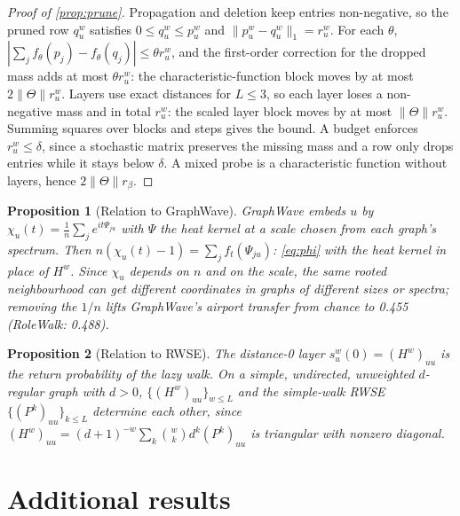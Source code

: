 \documentclass[10pt]{article}
\newtheorem{proposition}{Proposition}
\theoremstyle{definition}
\newcommand{\nTh}{\lVert\Theta\rVert}
\begin{document}
\begin{proof}[Proof of \cref{prop:prune}]
Propagation and deletion keep entries non-negative, so the pruned row $q^w_u$ satisfies $0\le q^w_u\le p^w_u$ and $\lVert p^w_u - q^w_u\rVert_1 = r^w_u$. For each $\theta$, $|\sum_j f_\theta(p_j)-f_\theta(q_j)|\le\theta r^w_u$, and the first-order correction for the dropped mass adds at most $\theta r^w_u$: the characteristic-function block moves by at most $2\nTh r^w_u$. Layers use exact distances for $L\le3$, so each layer loses a non-negative mass and in total $r^w_u$: the scaled layer block moves by at most $\nTh r^w_u$. Summing squares over blocks and steps gives the bound. A budget enforces $r^w_u\le\delta$, since a stochastic matrix preserves the missing mass and a row only drops entries while it stays below $\delta$. A mixed probe is a characteristic function without layers, hence $2\nTh r_\beta$.
\end{proof}

\begin{proposition}[Relation to GraphWave]\label{prop:graphwave}
GraphWave embeds $u$ by $\chi_u(t) = \frac1n\sum_j e^{it\Psi_{ju}}$ with $\Psi$ the heat kernel at a scale chosen from each graph's spectrum. Then $n(\chi_u(t)-1) = \sum_j f_t(\Psi_{ju})$: \eqref{eq:phi} with the heat kernel in place of $H^w$. Since $\chi_u$ depends on $n$ and on the scale, the same rooted neighbourhood can get different coordinates in graphs of different sizes or spectra; removing the $1/n$ lifts GraphWave's airport transfer from chance to 0.455 (RoleWalk: 0.488).
\end{proposition}

\begin{proposition}[Relation to RWSE]
The distance-0 layer $s^w_u(0) = (H^w)_{uu}$ is the return probability of the lazy walk. On a simple, undirected, unweighted $d$-regular graph with $d>0$, $\{(H^w)_{uu}\}_{w\le L}$ and the simple-walk RWSE $\{(P^k)_{uu}\}_{k\le L}$ determine each other, since $(H^w)_{uu} = (d+1)^{-w}\sum_{k}\binom{w}{k}d^k(P^k)_{uu}$ is triangular with nonzero diagonal.
\end{proposition}

\section{Additional results}\label{app:results}
\end{document}
